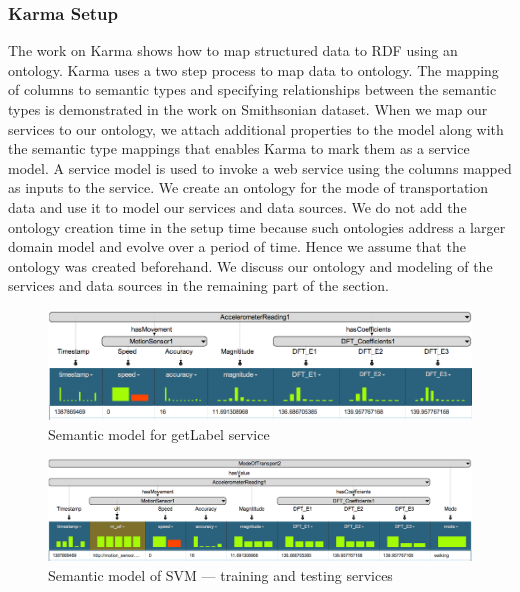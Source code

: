 \subsubsection{Karma Setup} 
The work on Karma\cite{knoblock12:eswc} shows how to map structured data to RDF using an ontology. Karma uses a two step process to map data to ontology. The mapping of columns to semantic types and specifying relationships between the semantic types is demonstrated in the work on Smithsonian dataset\cite{szekely14:ijhac}. When we map our services to our ontology, we attach additional properties to the model along with the semantic type mappings that enables Karma to mark them as a service model. A service model is used to invoke a web service using the columns mapped as inputs to the service. We create an ontology for the mode of transportation data and use it to model our services and data sources. We do not add the ontology creation time in the setup time because such ontologies address a larger domain model and evolve over a period of time. Hence we assume that the ontology was created beforehand. We discuss our ontology and modeling of the services and data sources in the remaining part of the section.

\begin{figure}[ht!]
\centering
\includegraphics[width=184mm]{img/getLabelService}
\caption{Semantic model for getLabel service\label{fig:imgGetLabelService}}
\end{figure}

\begin{figure}[bp]
\centering
\includegraphics[width=186mm]{img/svmService}
\caption{Semantic model of SVM --- training and testing services\label{fig:svmService}}
\end{figure}

